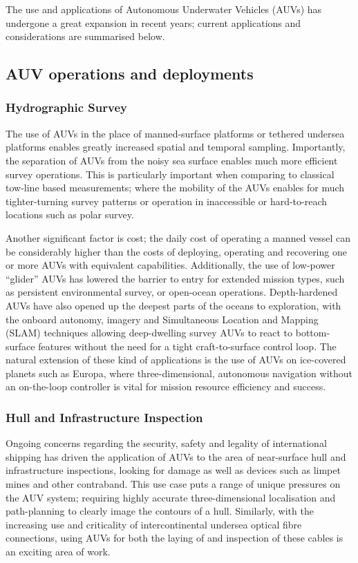 \documentclass[conference,compsoc,letterpaper]{IEEEtran}
\begin{document}
The use and applications of Autonomous Underwater Vehicles (AUVs) has undergone a great expansion in recent years; current applications and considerations are summarised below.


\subsection{AUV operations and deployments}

\subsubsection{Hydrographic Survey}

The use of AUVs in the place of manned-surface platforms or tethered undersea platforms enables greatly increased spatial and temporal sampling.
Importantly, the separation of AUVs from the noisy sea surface enables much more efficient survey operations.
This is particularly important when comparing to classical tow-line based measurements; where the mobility of the AUVs enables for much tighter-turning survey patterns or operation in inaccessible or hard-to-reach locations such as polar survey\cite{Curtin1993}.

Another significant factor is cost; the daily cost of operating a manned vessel can be considerably higher than the costs of deploying, operating and recovering one or more AUVs with equivalent capabilities\cite{Nicholson2008}.
Additionally, the use of low-power ``glider'' AUVs has lowered the barrier to entry for extended mission types, such as persistent environmental survey, or open-ocean operations. 
Depth-hardened AUVs have also opened up the deepest parts of the oceans to exploration, with the onboard autonomy, imagery and Simultaneous Location and Mapping (SLAM) techniques allowing deep-dwelling survey AUVs to react to bottom-surface features without the need for a tight craft-to-surface control loop.
The natural extension of these kind of applications is the use of AUVs on ice-covered planets such as Europa, where three-dimensional, autonomous navigation without an on-the-loop controller is vital for mission resource efficiency and success.

\subsubsection{Hull and Infrastructure Inspection}
Ongoing concerns regarding the security, safety and legality of international shipping has driven the application of AUVs to the area of near-surface hull and infrastructure inspections, looking for damage as well as devices such as limpet mines and other contraband.
This use case puts a range of unique pressures on the AUV system; requiring highly accurate three-dimensional localisation and path-planning to clearly image the contours of a hull\cite{Nicholson2008}.
Similarly, with the increasing use and criticality of intercontinental undersea optical fibre connections, using AUVs for both the laying of and inspection of these cables is an exciting area of work\cite{Yu2004}\cite{Asakawa2002}.
\end{document}
